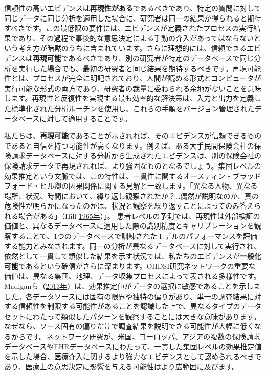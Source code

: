 \documentclass[
  11pt]{book}
\theoremstyle{definition}
\theoremstyle{definition}
\theoremstyle{definition}
\theoremstyle{definition}
\theoremstyle{remark}
\begin{document}
信頼性の高いエビデンスは\textbf{再現性がある}であるべきであり、特定の質問に対して同じデータに同じ分析を適用した場合に、研究者は同一の結果が得られると期待すべきです。この最低限の要件には、エビデンスが定義されたプロセスの実行結果であり、その過程で事後的な意思決定による手動の介入があってはならないという考え方が暗黙のうちに含まれています。さらに理想的には、信頼できるエビデンスは\textbf{再現可能}であるべきであり、別の研究者が特定のデータベースで同じ分析を実行した場合でも、最初の研究者と同じ結果を期待するべきです。再現可能性とは、プロセスが完全に明記されており、人間が読める形式とコンピュータが実行可能な形式の両方であり、研究者の裁量に委ねられる余地がないことを意味します。再現性と反復性を実現する最も効率的な解決策は、入力と出力を定義した標準化された分析ルーチンを使用し、これらの手順をバージョン管理されたデータベースに対して適用することです。

私たちは、\textbf{再現可能}であることが示されれば、そのエビデンスが信頼できるものであると自信を持つ可能性が高くなります。例えば、ある大手民間保険会社の保険請求データベースに対する分析から生成されたエビデンスは、別の保険会社の保険請求データで再現されれば、より強固なものとなるでしょう。集団レベルの効果推定という文脈では、この特性は、一貫性に関するオースティン・ブラッドフォード・ヒル卿の因果関係に関する見解と一致します。「異なる人物、異なる場所、状況、時間において、繰り返し観察されたか？\ldots 偶然が説明なのか、真の危険性が明らかになったのかは、状況と観察を繰り返すことによってのみ答えられる場合がある」（Hill \href{https://ohdsi.github.io/TheBookOfOhdsi/EvidenceQuality.html\#ref-hill_1965}{1965年}）」。 患者レベルの予測では、再現性は外部検証の価値と、異なるデータベースに適用した際の識別精度とキャリブレーションを観察することで、1つのデータベースで訓練されたモデルのパフォーマンスを評価する能力とみなされます。同一の分析が異なるデータベースに対して実行され、依然として一貫して類似した結果を示す状況では、私たちのエビデンスが\textbf{一般化可能}であるという確信がさらに深まります。OHDSI研究ネットワークの重要な価値は、異なる集団、地理、データ収集プロセスによって表される多様性です。Madiganら（\href{https://ohdsi.github.io/TheBookOfOhdsi/EvidenceQuality.html\#ref-madigan_2013}{2013年}）は、効果推定値がデータの選択に敏感であることを示しました。各データソースには固有の限界や独特の偏りがあり、単一の調査結果に対する信頼性を制限する可能性があることを認識した上で、異なるタイプのデータセットにわたって類似したパターンを観察することには大きな意味があります。なぜなら、ソース固有の偏りだけで調査結果を説明できる可能性が大幅に低くなるからです。ネットワーク研究が、米国、ヨーロッパ、アジアの複数の保険請求データベースやEHRデータベースにわたって、一貫した集団レベルの効果推定値を示した場合、医療介入に関するより強力なエビデンスとして認められるべきであり、医療上の意思決定に影響を与える可能性はより広範囲に及びます。
\end{document}
